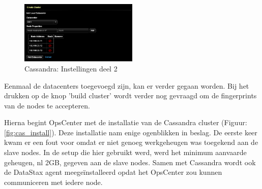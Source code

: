 \begin{figure}[H]
  	\centering
    \includegraphics[width=0.5\textwidth]{img/4_installatie_cassandra/1_Configuration_part_2}
    \caption{Cassandra: Instellingen deel 2}
    \label{fig:cas_conf_2}
\end{figure}

Eenmaal de datacenters toegevoegd zijn, kan er verder gegaan worden.
Bij het drukken op de knop 'build cluster' wordt verder nog gevraagd om de fingerprints van de nodes te accepteren.

Hierna begint OpsCenter met de installatie van de Cassandra cluster (Figuur: \ref{fig:cas_install}).
Deze installatie nam enige ogenblikken in beslag.
De eerste keer kwam er een fout voor omdat er niet genoeg werkgeheugen was toegekend aan de slave nodes.
In de setup die hier gebruikt werd, werd het minimum aanvaarde geheugen, nl 2GB, gegeven aan de slave nodes.
Samen met Cassandra wordt ook de DataStax agent meegeïnstalleerd opdat het OpsCenter zou kunnen communiceren met iedere node.


